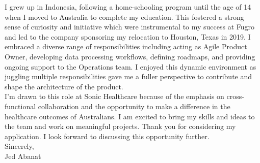 I grew up in Indonesia, following a home-schooling program until the age of 14 when I moved to Australia to complete my education. This fostered a strong sense of curiosity and initiative which were instrumental to my success at Fugro and led to the company sponsoring my relocation to Houston, Texas in 2019. I embraced a diverse range of responsibilities including acting as Agile Product Owner, developing data processing workflows, defining roadmaps, and providing ongoing support to the Operations team. I enjoyed this dynamic environment as juggling multiple responsibilities gave me a fuller perspective to contribute and shape the architecture of the product. \\

I’m drawn to this role at Sonic Healthcare because of the emphasis on cross-functional collaboration and the opportunity to make a difference in the healthcare outcomes of Australians. I am excited to bring my skills and ideas to the team and work on meaningful projects.  Thank you for considering my application. I look forward to discussing this opportunity further. \\

Sincerely,\\
Jed Abanat